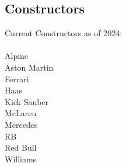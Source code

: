 \documentclass[12pt]{article}
\begin{document}
\subsection{Constructors}
Current Constructors as of 2024:\\
\\
Alpine\\
Aston Martin\\
Ferrari\\
Haas\\
Kick Sauber\\
McLaren\\
Mercedes\\
RB\\
Red Bull\\
Williams\\
\end{document}
